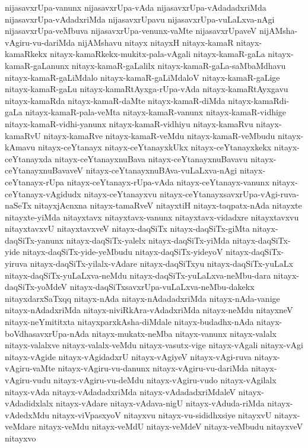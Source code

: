 {nijasavxrUpa-vanunx
nijasavxrUpa-vAda
nijasavxrUpa-vAdadadxriMda
nijasavxrUpa-vAdadxriMda
nijasavxrUpavu
nijasavxrUpa-vuLaLxva-nAgi
nijasavxrUpa-veMbuva
nijasavxrUpa-venunx-vaMte
nijasavxrUpaveV
nijAMsha-vAgiru-vu-dariMda
nijAMshavu
nitayx
nitayxH
nitayx-kamaR
nitayx-kamaRkekx
nitayx-kamaRkekx-mukitx-pala-vAgali
nitayx-kamaR-gaLa
nitayx-kamaR-gaLanunx
nitayx-kamaR-gaLalilx
nitayx-kamaR-gaLa-saMbaMdhavu
nitayx-kamaR-gaLiMdalo
nitayx-kamaR-gaLiMdaloV
nitayx-kamaR-gaLige
nitayx-kamaR-gaLu
nitayx-kamaRtAyxga-rUpa-vAda
nitayx-kamaRtAyxgavu
nitayx-kamaRda
nitayx-kamaR-daMte
nitayx-kamaR-diMda
nitayx-kamaRdi-gaLa
nitayx-kamaR-pala-veMta
nitayx-kamaR-vanunx
nitayx-kamaR-vidhige
nitayx-kamaR-vidhi-yanunx
nitayx-kamaR-vidhiyu
nitayx-kamaRvu
nitayx-kamaRvU
nitayx-kamaRve
nitayx-kamaR-veMdu
nitayx-kamaR-veMbudu
nitayx-kAmavu
nitayx-ceYtanayx
nitayx-ceYtanayxkUkx
nitayx-ceYtanayxkekx
nitayx-ceYtanayxda
nitayx-ceYtanayxnuBava
nitayx-ceYtanayxnuBavavu
nitayx-ceYtanayxnuBavaveV
nitayx-ceYtanayxnuBAva-vuLaLxva-nAgi
nitayx-ceYtanayx-rUpa
nitayx-ceYtanayx-rUpa-vAda
nitayx-ceYtanayx-vanunx
nitayx-ceYtanayx-vAgidudx
nitayx-ceYtanayxvu
nitayx-ceYtanayxsavxrUpa-vAgi-ruva-naSeTx
nitayxjAcnxna
nitayx-tamaRveV
nitayxtiH
nitayx-taqpatx-nAda
nitayxte
nitayxte-yiMda
nitayxtavx
nitayxtavx-vanunx
nitayxtavx-vidadxre
nitayxtavxvu
nitayxtavxvU
nitayxtavxveV
nitayx-daqSiTx
nitayx-daqSiTx-giMta
nitayx-daqSiTx-yanunx
nitayx-daqSiTx-yalelx
nitayx-daqSiTx-yiMda
nitayx-daqSiTx-yide
nitayx-daqSiTx-yide-yeMbudu
nitayx-daqSiTx-yideyoV
nitayx-daqSiTx-yiruva
nitayx-daqSiTx-yilalx-vAdare
nitayx-daqSiTxyu
nitayx-daqSiTx-yuLaLx
nitayx-daqSiTx-yuLaLxva-neMdu
nitayx-daqSiTx-yuLaLxva-neMbu-dara
nitayx-daqSiTx-yoMdeV
nitayx-daqSiTxsavxrUpa-vuLaLxva-neMbu-dakekx
nitayxdarxSaTxqq
nitayx-nAda
nitayx-nAdadadxriMda
nitayx-nAda-vanige
nitayx-nAdadxriMda
nitayx-niviRkAra-vAdadxriMda
nitayx-neMdu
nitayxneV
nitayx-neYmititxta
nitayxparxkAsha-diMdale
nitayx-budadhx-nAda
nitayx-boVdhasavxrUpa-nAda
nitayx-mukatx-neMba
nitayx-vanunx
nitayx-valalx
nitayx-valalxve
nitayx-valalx-veMdu
nitayx-vasutx-vige
nitayx-vAgali
nitayx-vAgi
nitayx-vAgide
nitayx-vAgidadxrU
nitayx-vAgiyeV
nitayx-vAgi-ruva
nitayx-vAgiru-vaMte
nitayx-vAgiru-vu-danunx
nitayx-vAgiru-vu-dariMda
nitayx-vAgiru-vudu
nitayx-vAgiru-vu-deMdu
nitayx-vAgiru-vudo
nitayx-vAgilalx
nitayx-vAda
nitayx-vAdadadxriMda
nitayx-vAdadadxriMdaleV
nitayx-vAdadidxlalx
nitayx-vAdare
nitayx-vAdava-nigU
nitayx-vAduda-riMda
nitayx-vAdedxMdu
nitayx-viVpasxyoV
nitayxvu
nitayx-vu-sididhxsiye
nitayxvU
nitayx-veMdare
nitayx-veMdu
nitayx-veMdU
nitayx-veMdeV
nitayx-veMbudu
nitayxveV
nitayxvo
}
